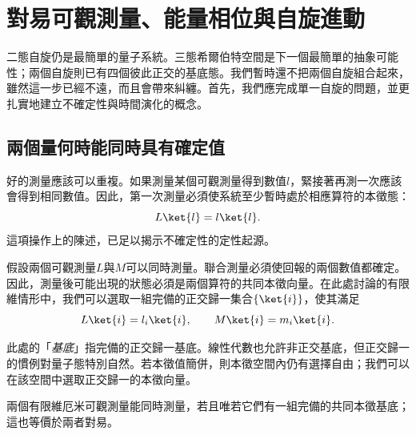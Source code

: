 \chapter{對易可觀測量、能量相位與自旋進動}


二態自旋仍是最簡單的量子系統。三態希爾伯特空間是下一個最簡單的抽象可能性；兩個自旋則已有四個彼此正交的基底態。我們暫時還不把兩個自旋組合起來，雖然這一步已經不遠，而且會帶來糾纏。首先，我們應完成單一自旋的問題，並更扎實地建立不確定性與時間演化的概念。

\section{兩個量何時能同時具有確定值}

好的測量應該可以重複。如果測量某個可觀測量得到數值\(l\)，緊接著再測一次應該會得到相同數值。因此，第一次測量必須使系統至少暫時處於相應算符的本徵態：
\begin{equation}
L\ket{l}=l\ket{l}.
\end{equation}
這項操作上的陳述，已足以揭示不確定性的定性起源。

假設兩個可觀測量\(L\)與\(M\)可以同時測量。聯合測量必須使回報的兩個數值都確定。因此，測量後可能出現的狀態必須是兩個算符的共同本徵向量。在此處討論的有限維情形中，我們可以選取一組完備的正交歸一集合\(\{\ket{i}\}\)，使其滿足
\begin{equation}
L\ket{i}=l_i\ket{i},
\qquad
M\ket{i}=m_i\ket{i}.
\label{eq:l5-common-eigenvectors}
\end{equation}

\begin{remark}
此處的「\emph{基底}」指完備的正交歸一基底。線性代數也允許非正交基底，但正交歸一的慣例對量子態特別自然。若本徵值簡併，則本徵空間內仍有選擇自由；我們可以在該空間中選取正交歸一的本徵向量。
\end{remark}

\begin{theorem}
兩個有限維厄米可觀測量能同時測量，若且唯若它們有一組完備的共同本徵基底；這也等價於兩者對易。
\end{theorem}

